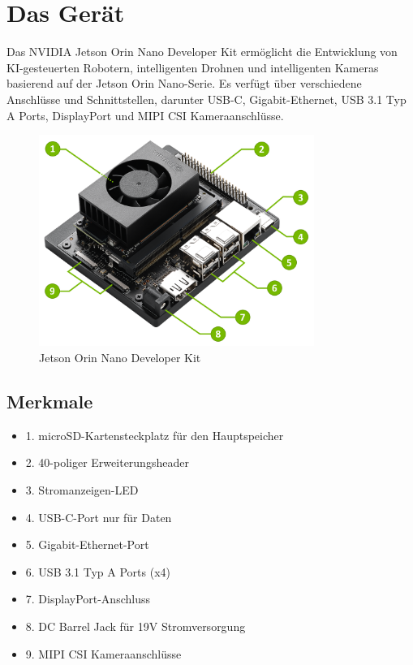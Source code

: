 \documentclass[12pt,a4paper]{report}
\begin{document}
\newpage

\section{Das Gerät}
Das NVIDIA Jetson Orin Nano Developer Kit ermöglicht die Entwicklung von KI-gesteuerten Robotern, intelligenten Drohnen und intelligenten Kameras basierend auf der Jetson Orin Nano-Serie. Es verfügt über verschiedene Anschlüsse und Schnittstellen, darunter USB-C, Gigabit-Ethernet, USB 3.1 Typ A Ports, DisplayPort und MIPI CSI Kameraanschlüsse.

\begin{figure}[h!]
    \centering

    \includegraphics[width=0.8\textwidth]{Bilder/jetsonOrinNano8GB.png} 

    \caption{Jetson Orin Nano Developer Kit}
\end{figure}

\subsection*{Merkmale}

\begin{itemize}
    \item 1. microSD-Kartensteckplatz für den Hauptspeicher
    \item 2. 40-poliger Erweiterungsheader
    \item 3. Stromanzeigen-LED
    \item 4. USB-C-Port nur für Daten
    \item 5. Gigabit-Ethernet-Port
    \item 6. USB 3.1 Typ A Ports (x4)
    \item 7. DisplayPort-Anschluss
    \item 8. DC Barrel Jack für 19V Stromversorgung
    \item 9. MIPI CSI Kameraanschlüsse
\end{itemize}
\end{document}

